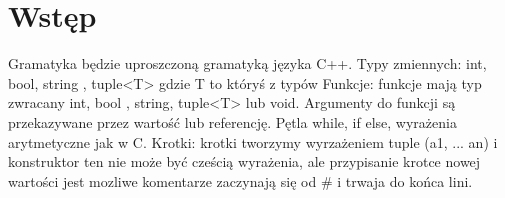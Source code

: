 \documentclass{article}
\begin{document}
\section{Wstęp}
Gramatyka będzie uproszczoną gramatyką języka C++.\newline
Typy zmiennych: int, bool, string , tuple<T> gdzie T to któryś z typów\newline
Funkcje: funkcje mają typ zwracany int, bool , string, tuple<T> lub void. Argumenty do funkcji są przekazywane przez wartość lub referencję. \newline
Pętla while, if else, wyrażenia arytmetyczne jak w C. \newline
Krotki: krotki tworzymy wyrzażeniem tuple (a1, ... an) i konstruktor ten nie może być cześcią wyrażenia, ale przypisanie krotce nowej wartości jest mozliwe\newline
komentarze zaczynają się od \# i trwaja do końca lini.\newline
\end{document}

